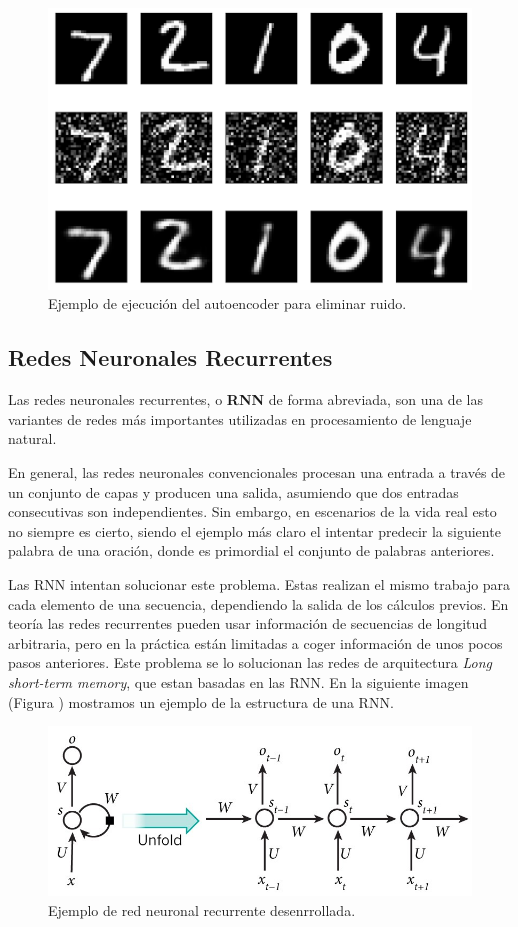 \documentclass[
  a4paper,
  12pt,
  spanish,
]{scrartcl}
\theoremstyle{teorema-style}
\begin{document}
\begin{figure}[h]
  \centering
  \includegraphics[width=.8\textwidth]{img/autoencoder_ex2}
  \caption{Ejemplo de ejecución del autoencoder para eliminar ruido.}
  \label{fig:autoencoder_ex1}
\end{figure}




\subsection{Redes Neuronales Recurrentes}%
\label{sub:redes_neuronales_recurrentes}

Las redes neuronales recurrentes, o \textbf{RNN} de forma abreviada, son una de las variantes de redes más importantes utilizadas en procesamiento de lenguaje natural.

En general, las redes neuronales convencionales procesan una entrada a través de un conjunto de capas y producen una salida, asumiendo que dos entradas consecutivas son independientes. Sin embargo, en escenarios de la vida real esto no siempre es cierto, siendo el ejemplo más claro el intentar predecir la siguiente palabra de una oración, donde es primordial el conjunto de palabras anteriores.

Las RNN intentan solucionar este problema. Estas realizan el mismo trabajo para cada elemento de una secuencia, dependiendo la salida de los cálculos previos. En teoría las redes recurrentes pueden usar información de secuencias de longitud arbitraria, pero en la práctica están limitadas a coger información de unos pocos pasos anteriores. Este problema se lo solucionan las redes de arquitectura \textit{Long short-term memory}, que estan basadas en las RNN. En la siguiente imagen (Figura ) mostramos un ejemplo de la estructura de una RNN.

\begin{figure}[h]
    \centering
    \includegraphics[width=0.7\linewidth]{img/rnn.jpeg}
    \caption{Ejemplo de red neuronal recurrente desenrrollada.}%
    \label{fig:rnn}
\end{figure}
\end{document}

